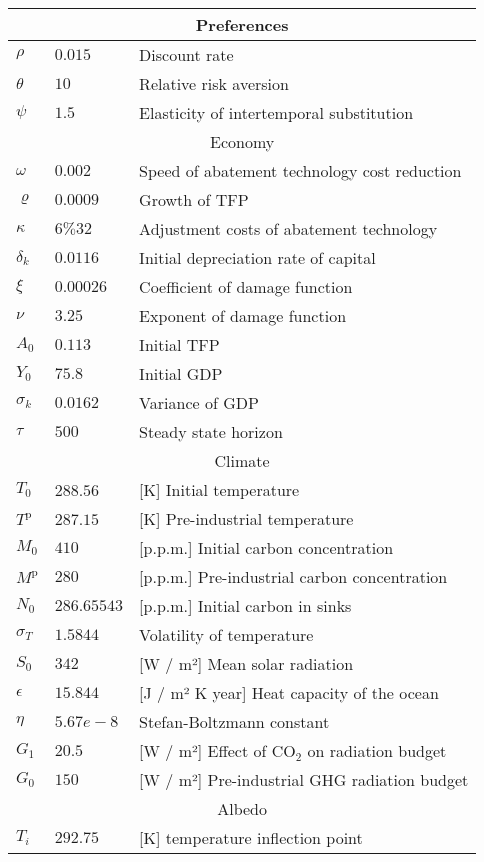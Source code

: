 \documentclass[../../main.tex]{subfiles}
\begin{document}
\begin{tabular}{ |p{1cm}||p{3cm}|p{10cm}|  }
    \hline
    \multicolumn{3}{|c|}{Preferences} \\
    \hline
    $\rho$ & $0.015$ & Discount rate \\
    $\theta$ & $10$ & Relative risk aversion \\
    $\psi$ & $1.5$ & Elasticity of intertemporal substitution \\
    \hline\hline
    \multicolumn{3}{|c|}{Economy} \\
    \hline
    $\omega$ & $0.002$ & Speed of abatement technology cost reduction \\
    $\varrho$ & $0.0009$ & Growth of TFP \\
    $\kappa$ & $6\%32$ & Adjustment costs of abatement technology \\
    $\delta_k$ & $0.0116$ & Initial depreciation rate of capital \\
    $\xi$ & $0.00026$ & Coefficient of damage function \\
    $\nu$ & $3.25$ & Exponent of damage function \\
    $A_0$ & $0.113$ & Initial TFP \\
    $Y_0$ & $75.8$ & Initial GDP \\
    $\sigma_k$ & $0.0162$ & Variance of GDP \\
    $\tau$ & $500$ & Steady state horizon  \\
    \hline
    \hline 
    \multicolumn{3}{|c|}{Climate} \\
    \hline
    $T_0$ & 288.$56$ & [K] Initial temperature \\
    $T^{\mathrm{p}}$ & 287.$15$ & [K] Pre-industrial temperature \\
    $M_0$ & $410$ & [p.p.m.] Initial carbon concentration \\
    $M^{\mathrm{p}}$ & $280$ & [p.p.m.] Pre-industrial carbon concentration \\
    $N_0$ & $286.65543$ & [p.p.m.] Initial carbon in sinks \\
    $\sigma_T$ & $1.5844$ & Volatility of temperature \\
    $S_0$ & $342$ & [W / m²] Mean solar radiation \\
    $\epsilon$ & $15.844$ & [J / m² K year] Heat capacity of the ocean \\
    $\eta$ & $5.67e-8$ & Stefan-Boltzmann constant  \\
    $G_1$ & $20.5$ & [W / m²] Effect of CO$_2$ on radiation budget \\
    $G_0$ & $150$ & [W / m²] Pre-industrial GHG radiation budget \\
    \hline\hline
    \multicolumn{3}{|c|}{Albedo} \\
    \hline 
    $T_i$ & $292.75$ & [K] temperature inflection point \\
    \hline
\end{tabular}
\end{document}
